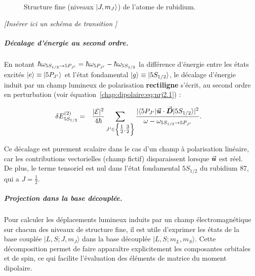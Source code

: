 \begin{figure}[!htb]
\begin{tikzpicture}
\end{tikzpicture}
\caption{Structure fine (niveaux $\ket{J, m_J}$) de l’atome de rubidium.}

\end{figure}
\vspace{1em}
\begin{center}
\textit{[Insérer ici un schéma de transition ]}
\end{center}

\subparagraph{Décalage d’énergie au second ordre.}

En notant $\hbar\omega_{\tiny 5S_{1/2} \rightarrow 5P_{J'}} = \hbar\omega_{5P_{J'}} - \hbar\omega_{5S_{1/2}}$ la différence d’énergie entre les états excités $\ket{e} \equiv \ket{5P_{J'}}$ et l’état fondamental $\ket{g} \equiv \ket{5S_{1/2}}$, le décalage d’énergie induit par un champ lumineux de polarisation \textbf{rectiligne} s’écrit, au second ordre en perturbation (voir équation~\eqref{chap:dipolaire:eq:nrj2.1}) :

\begin{eqnarray}
	\delta E_{5S_{1/2}}^{(2)} & = & \frac{|\mathcal{E}|^2}{4\hbar} \sum_{J' \in \left\{ \tfrac{1}{2}, \tfrac{3}{2} \right\}} 
		\frac{|\langle 5P_{J'}|\operatorvec{u} \cdot \operatorvec{D}|5S_{1/2}\rangle|^2}{\omega - \omega_{\tiny 5S_{1/2} \rightarrow 5P_{J'}}}.
	\label{chap:dipolaire:eq:nrj2.3}
\end{eqnarray}

Ce décalage est purement scalaire dans le cas d’un champ à polarisation linéaire, car les contributions vectorielles (champ fictif) disparaissent lorsque $\operatorvec{u}$ est réel. De plus, le terme tensoriel est nul dans l’état fondamental $5S_{1/2}$ du rubidium 87, qui a $J = \tfrac{1}{2}$.




\subparagraph{Projection dans la base découplée.}

Pour calculer les déplacements lumineux induits par un champ électromagnétique sur chacun des niveaux de structure fine, il est utile d'exprimer les états de la base couplée $|L, S; J, m_J\rangle$ dans la base découplée $|L, S; m_L, m_S\rangle$. Cette décomposition permet de faire apparaître explicitement les composantes orbitales et de spin, ce qui facilite l’évaluation des éléments de matrice du moment dipolaire.

